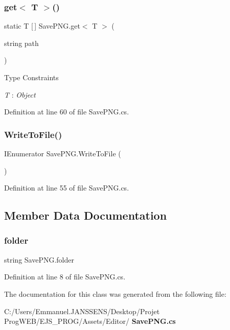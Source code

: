 \subsubsection{get$<$ T $>$()}
{\footnotesize\ttfamily static T [$\,$] Save\+P\+N\+G.\+get$<$ T $>$ (\begin{DoxyParamCaption}\item[{string}]{path }\end{DoxyParamCaption})\hspace{0.3cm}{\ttfamily [static]}}

\begin{Desc}
\item[Type Constraints]\begin{description}
\item[{\em T} : {\em Object}]\end{description}
\end{Desc}


Definition at line 60 of file Save\+P\+N\+G.\+cs.

\mbox{\label{class_save_p_n_g_a3539a9588d333eadb6130f6b608cc0a7}} 
\subsubsection{Write\+To\+File()}
{\footnotesize\ttfamily I\+Enumerator Save\+P\+N\+G.\+Write\+To\+File (\begin{DoxyParamCaption}{ }\end{DoxyParamCaption})}



Definition at line 55 of file Save\+P\+N\+G.\+cs.



\subsection{Member Data Documentation}
\mbox{\label{class_save_p_n_g_a607794d8b935169d4b94ffd78cf483c4}} 
\subsubsection{folder}
{\footnotesize\ttfamily string Save\+P\+N\+G.\+folder}



Definition at line 8 of file Save\+P\+N\+G.\+cs.



The documentation for this class was generated from the following file\+:\begin{DoxyCompactItemize}
\item 
C\+:/\+Users/\+Emmanuel.\+J\+A\+N\+S\+S\+E\+N\+S/\+Desktop/\+Projet Prog\+W\+E\+B/\+E\+J\+S\+\_\+\+P\+R\+O\+G/\+Assets/\+Editor/\textbf{ Save\+P\+N\+G.\+cs}\end{DoxyCompactItemize}
